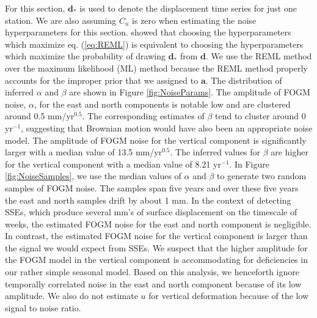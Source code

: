 \documentclass[10pt,letter]{article}
\begin{document}
For this section, $\bm{d}_*$ is used to denote the displacement time series for just one station. We are also assuming $C_u$ is zero when estimating the noise hyperparameters for this section. \citet{Harville1974} showed that choosing the hyperparameters which maximize eq. (\ref{eq:REML}) is equivalent to choosing the hyperparameters which maximize the probability of drawing $\bm{d}_*$ from $\bm{d}$.  We use the REML method over the maximum likelihood (ML) method \citep[e.g.,][]{Langbein1997} because the REML method properly accounts for the improper prior that we assigned to $\bm{a}$. The distribution of inferred $\alpha$ and $\beta$ are shown in Figure \ref{fig:NoiseParams}. The amplitude of FOGM noise, $\alpha$, for the east and north components is notable low and are clustered around 0.5 mm/yr$^{0.5}$. The corresponding estimates of $\beta$ tend to cluster around 0 yr$^{-1}$, suggesting that Brownian motion would have also been an appropriate noise model. The amplitude of FOGM noise for the vertical component is significantly larger with a median value of 13.5 mm/yr$^{0.5}$. The inferred values for $\beta$ are higher for the vertical component with a median value of 8.21 yr$^{-1}$. In Figure \ref{fig:NoiseSamples}, we use the median values of $\alpha$ and $\beta$ to generate two random samples of FOGM noise. The samples span five years and over these five years the east and north samples drift by about 1 mm. In the context of detecting SSEs, which produce several mm's of surface displacement on the timescale of weeks, the estimated FOGM noise for the east and north component is negligible. In contrast, the estimated FOGM noise for the vertical component is larger than the signal we would expect from SSEs. We suspect that the higher amplitude for the FOGM model in the vertical component is accommodating for deficiencies in our rather simple seasonal model. Based on this analysis, we henceforth ignore temporally correlated noise in the east and north component because of its low amplitude. We also do not estimate $u$ for vertical deformation because of the low signal to noise ratio.
\end{document}
